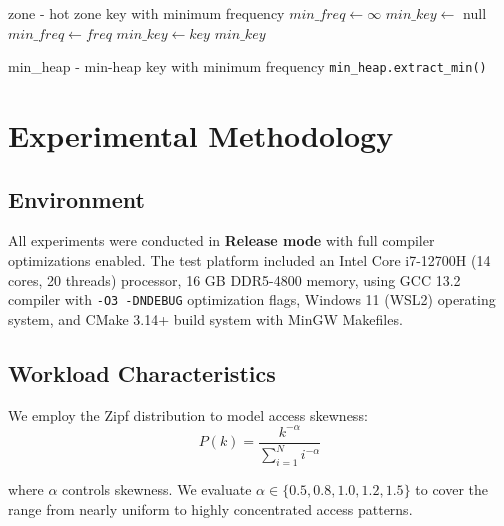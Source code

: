 \documentclass[11pt,a4paper]{article}
\begin{document}
\begin{algorithm}[H]
\caption{Eviction Operation (Basic Version)}
\label{alg:evict}
\begin{algorithmic}[1]
\Require zone - hot zone
\Ensure key with minimum frequency
\State $min\_freq \gets \infty$
\State $min\_key \gets$ null
        \State $min\_freq \gets freq$
        \State $min\_key \gets key$
    \EndIf
\EndFor
\State \Return $min\_key$
\end{algorithmic}
\end{algorithm}

\begin{algorithm}[H]
\caption{Eviction Operation (Heap-Optimized Version)}
\label{alg:evict_heap}
\begin{algorithmic}[1]
\Require min\_heap - min-heap
\Ensure key with minimum frequency
\State \Return \texttt{min\_heap.extract\_min()}
\end{algorithmic}
\end{algorithm}

\section{Experimental Methodology}

\subsection{Environment}

All experiments were conducted in \textbf{Release mode} with full compiler optimizations enabled. The test platform included an Intel Core i7-12700H (14 cores, 20 threads) processor, 16 GB DDR5-4800 memory, using GCC 13.2 compiler with \texttt{-O3 -DNDEBUG} optimization flags, Windows 11 (WSL2) operating system, and CMake 3.14+ build system with MinGW Makefiles.

\subsection{Workload Characteristics}

We employ the Zipf distribution to model access skewness:
\begin{equation}
P(k) = \frac{k^{-\alpha}}{\sum_{i=1}^{N} i^{-\alpha}}
\end{equation}

where $\alpha$ controls skewness. We evaluate $\alpha \in \{0.5, 0.8, 1.0, 1.2, 1.5\}$ to cover the range from nearly uniform to highly concentrated access patterns.
\end{document}
